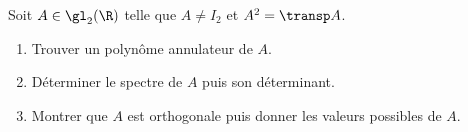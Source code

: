 \begin{enonce}
\begin{exercise}[ID={RMS 122-2 E1220 CCP PSI},subtitle={},tags={}]
  Soit $A\in\gl_2(\R)$ telle que $A\neq I_2$ et $A^2=\transp A$.
  \begin{enumerate}
    \item Trouver un polynôme annulateur de $A$.
    \item Déterminer le spectre de $A$ puis son déterminant.
    \item Montrer que $A$ est orthogonale puis donner les valeurs possibles de $A$.
  \end{enumerate}
\end{exercise}
\begin{solution}
\end{solution}
\end{enonce}
